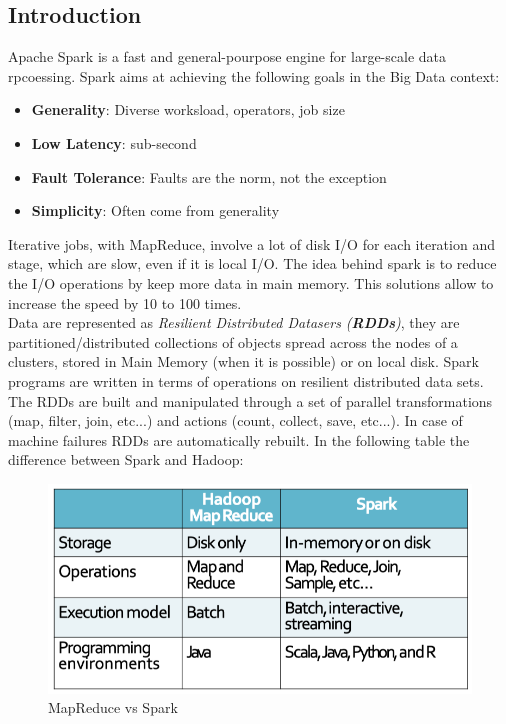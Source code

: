 \documentclass[12pt]{article}
\begin{document}
\subsection{Introduction}
Apache Spark is a fast and general-pourpose engine for large-scale data rpcoessing. Spark aims at achieving the following goals in the Big Data context:
\begin{itemize}
  \item \textbf{Generality}: Diverse worksload, operators, job size
  \item \textbf{Low Latency}: sub-second
  \item \textbf{Fault Tolerance}: Faults are the norm, not the exception
  \item \textbf{Simplicity}: Often come from generality
\end{itemize}
Iterative jobs, with MapReduce, involve a lot of disk I/O for each iteration and stage, which are slow, even if it is local I/O. The idea behind spark is to reduce the I/O operations by keep more data in main memory. This solutions allow to increase the speed by 10 to 100 times.\\
Data are represented as \textit{Resilient Distributed Datasers (\textbf{RDDs})}, they are partitioned/distributed collections of objects spread across the nodes of a clusters, stored in Main Memory (when it is possible) or on local disk.
Spark programs are written in terms of operations on resilient distributed data sets. The RDDs are built and manipulated through a set of parallel transformations (map, filter, join, etc...) and actions (count, collect, save, etc...). In case of machine failures RDDs are automatically rebuilt. In the following table the difference between Spark and Hadoop:
\begin{figure}[H]
  \includegraphics[width=\linewidth]{images/versus.png}
  \caption{MapReduce vs Spark}
  \label{fig:versus}
\end{figure}
\end{document}
